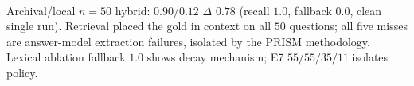 \begin{table}[t]\centering\caption{LongMemEval real $n{=}50$ --- archival (primary) vs.\ lexical ablation. $acc$ via 70B hybrid judge (details in Appendix~\S\ref{app:ruler}).}\label{tab:lme50}
\\{\footnotesize Archival/local $n{=}50$ hybrid: $0.90/0.12$ $\Delta$ $0.78$ (recall $1.0$, fallback $0.0$, clean single run). Retrieval placed the gold in context on all $50$ questions; all five misses are answer-model extraction failures, isolated by the PRISM methodology. Lexical ablation fallback $1.0$ shows decay mechanism; E7 $55/55/35/11$ isolates policy.}
\end{table}